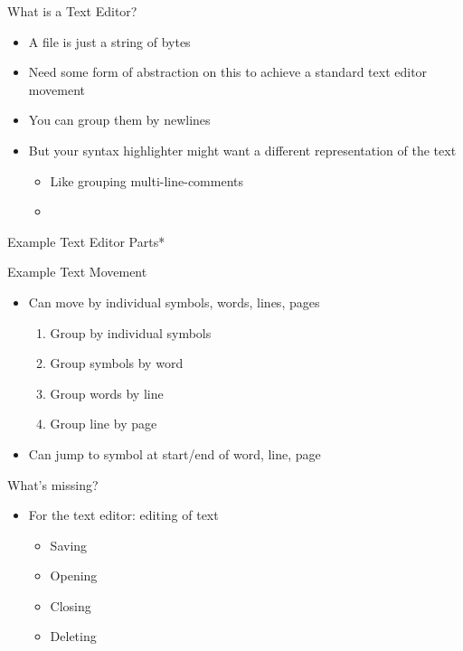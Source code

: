 \documentclass[UKenglish]{beamer}
\begin{document}
\begin{frame}{What is a Text Editor?}
  \begin{itemize}
    \item A file is just a string of bytes
    \item Need some form of abstraction on this to achieve a standard text
    editor movement
    \item You can group them by newlines
    \item But your syntax highlighter might want a different representation of the text
    \begin{itemize}
      \item Like grouping multi-line-comments
      \item 
    \end{itemize}
  \end{itemize}
\end{frame}

\begin{frame}{Example Text Editor Parts*}
  \center
  
\end{frame}

\begin{frame}{Example Text Movement}
  \begin{itemize}
    \item Can move by individual symbols, words, lines, pages
    \begin{enumerate}
      \item Group by individual symbols
      \item Group symbols by word
      \item Group words by line
      \item Group line by page
    \end{enumerate}
    \item Can jump to symbol at start/end of word, line, page
  \end{itemize}
\end{frame}

\begin{frame}{What's missing?}
  \begin{itemize}
    \item For the text editor: editing of text
    \begin{itemize}
      \item Saving
      \item Opening
      \item Closing
      \item Deleting
    \end{itemize}
  \end{itemize}
\end{frame}
\end{document}

